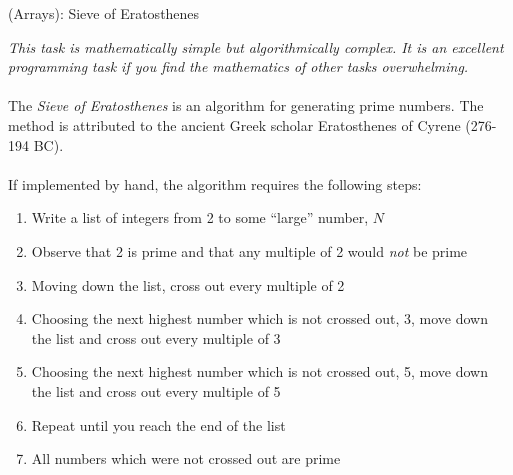 \documentclass{lab}
\begin{document}
\pagebreak
\begin{task}{(Arrays): Sieve of Eratosthenes}{}

\textit{This task is mathematically simple but algorithmically complex. It is an excellent programming task if you find the mathematics of other tasks overwhelming.}
\\~\\
The \textit{Sieve of Eratosthenes} is an algorithm for generating prime numbers. The method is attributed to the ancient Greek scholar Eratosthenes of Cyrene (276-194 BC).
\\~\\
If implemented by hand, the algorithm requires the following steps:

\begin{enumerate}
\item Write a list of integers from 2 to some ``large'' number, $N$
\item Observe that 2 is prime and that any multiple of 2 would \textit{not} be prime
\item Moving down the list, cross out every multiple of 2
\item Choosing the next highest number which is not crossed out, 3, move down the list and cross out every multiple of 3
\item Choosing the next highest number which is not crossed out, 5, move down the list and cross out every multiple of 5
\item Repeat until you reach the end of the list
\item All numbers which were not crossed out are prime
\end{enumerate}


\end{task}
\end{document}
